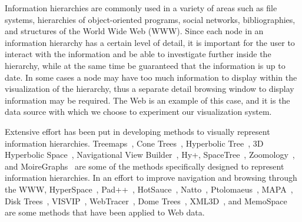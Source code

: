 \documentclass[10pt,psfig]{article}
\begin{document}
Information hierarchies are commonly used in a variety of areas such as file systems, hierarchies of object-oriented programs, social networks,
bibliographies, and structures of the World Wide Web (WWW).
Since each node in an information hierarchy has a certain level of detail, it is important for the user to interact with the information and be able to investigate further inside the hierarchy, while at the same time be guaranteed that the information is up to date.
In some cases a node may have too much information to display within the visualization of the hierarchy, thus a separate detail browsing window to display information may be required.
The Web is an example of this case, and it is the data source with which we choose to experiment our visualization system.

Extensive effort has been put in developing methods to visually represent information hierarchies.
Treemaps~\cite{bs-91}, Cone Trees~\cite{rms91}, Hyperbolic Tree~\cite{lrp-95}, 3D Hyperbolic Space~\cite{mb-95}, Navigational View Builder~\cite{mf-95}, Hy+\cite{hmv-95}, SpaceTree~\cite{pgb02}, Zoomology~\cite{hdrw-03}, and MoireGraphs~\cite{km-03} are some of the methods specifically designed to represent information hierarchies.
In an effort to improve navigation and browsing through the WWW, HyperSpace~\cite{wdbh-95}, Pad++~\cite{b96}, HotSauce~\cite{g02}, Natto~\cite{sm97}, Ptolomaeus~\cite{blv98}, MAPA~\cite{dk98}, Disk Trees~\cite{cpmpg-98}, VISVIP~\cite{cs-99}, WebTracer~\cite{webtracer}, Dome Trees~\cite{cpp-00}, XML3D~\cite{rcmc-00}, and MemoSpace~\cite{wls05} are some methods that have been applied to Web data.
\end{document}
